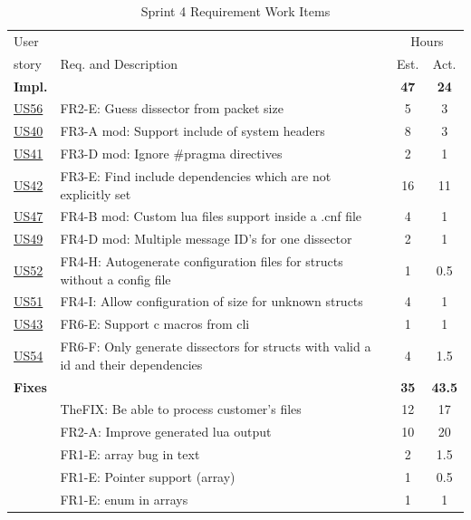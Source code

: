 \begin{table}[htbp] \small \center
\caption{Sprint 4 Requirement Work Items \label{tab:sprint4req}}
\begin{tabularx}{\textwidth}{l X c c}
	\toprule
	User & & \multicolumn{2}{c}{Hours} \\
	\cmidrule(r){3-4}
	story & Req. and Description & Est. & Act. \\
	\midrule
	\textbf{Impl.} &  & \textbf{47} & \textbf{24} \\
	\hyperref[tab:req:stories13]{US56} & FR2-E: Guess \gls{dissector} from \gls{packet} size & 5 & 3 \\
 	\hyperref[tab:req:stories10]{US40} & FR3-A mod: Support \gls{include} of system \glspl{header} &  8  & 3 \\
	\hyperref[tab:req:stories10]{US41} & FR3-D mod: Ignore \#pragma directives & 2 & 1 \\
	\hyperref[tab:req:stories10]{US42} & FR3-E: Find include dependencies which are not explicitly set & 16  & 11 \\
	\hyperref[tab:req:stories11]{US47} & FR4-B mod: Custom \Gls{lua} files support inside a .cnf file & 4 & 1 \\
	\hyperref[tab:req:stories12]{US49} & FR4-D mod: Multiple message ID's for one \gls{dissector} & 2 & 1 \\
	\hyperref[tab:req:stories12]{US52} & FR4-H: Autogenerate configuration files for \glspl{struct} without a config file & 1  & 0.5\\
	\hyperref[tab:req:stories12]{US51} & FR4-I: Allow configuration of size for unknown \glspl{struct} & 4 & 1 \\
	\hyperref[tab:req:stories10]{US43} & FR6-E: Support \Gls{c} macros from \gls{cli} & 1 & 1 \\
	\hyperref[tab:req:stories12]{US54} & FR6-F: Only generate \glspl{dissector} for \glspl{struct} with valid a id and their dependencies & 4 & 1.5 \\
	\addlinespace
	\textbf{Fixes} &  & \textbf{35} & \textbf{43.5} \\
	& TheFIX: Be able to process customer's files & 12 & 17 \\
	 & FR2-A: Improve generated \Gls{lua} output & 10 & 20 \\
	 & FR1-E: \Gls{array} bug in text & 2 & 1.5 \\
	 & FR1-E: Pointer support (array) & 1 & 0.5 \\
	 & FR1-E: \Gls{enum} in \glspl{array} & 1 & 1 \\		

\end{tabularx}
\end{table}
